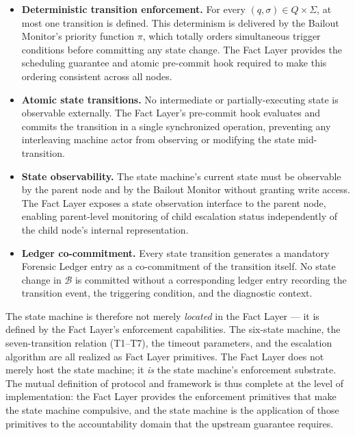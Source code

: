 \begin{itemize}\itemsep=0pt
\item[(\textit{i})] \textbf{Deterministic transition enforcement.} For every $(q, \sigma) \in Q \times \Sigma$, at most one transition is defined. This determinism is delivered by the Bailout Monitor's priority function $\pi$, which totally orders simultaneous trigger conditions before committing any state change. The Fact Layer provides the scheduling guarantee and atomic pre-commit hook required to make this ordering consistent across all nodes.

\item[(\textit{ii})] \textbf{Atomic state transitions.} No intermediate or partially-executing state is observable externally. The Fact Layer's pre-commit hook evaluates and commits the transition in a single synchronized operation, preventing any interleaving machine actor from observing or modifying the state mid-transition.

\item[(\textit{iii})] \textbf{State observability.} The state machine's current state must be observable by the parent node and by the Bailout Monitor without granting write access. The Fact Layer exposes a state observation interface to the parent node, enabling parent-level monitoring of child escalation status independently of the child node's internal representation.

\item[(\textit{iv})] \textbf{Ledger co-commitment.} Every state transition generates a mandatory Forensic Ledger entry as a co-commitment of the transition itself. No state change in $\mathcal{B}$ is committed without a corresponding ledger entry recording the transition event, the triggering condition, and the diagnostic context.
\end{itemize}

The state machine is therefore not merely \emph{located} in the Fact Layer --- it is defined by the Fact Layer's enforcement capabilities. The six-state machine, the seven-transition relation (T1--T7), the timeout parameters, and the escalation algorithm are all realized as Fact Layer primitives. The Fact Layer does not merely host the state machine; it \emph{is} the state machine's enforcement substrate. The mutual definition of protocol and framework is thus complete at the level of implementation: the Fact Layer provides the enforcement primitives that make the state machine compulsive, and the state machine is the application of those primitives to the accountability domain that the upstream guarantee requires.

